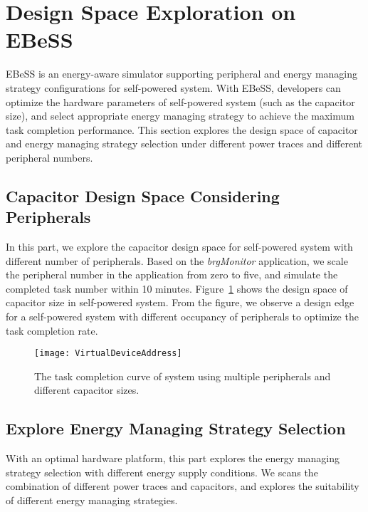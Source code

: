 \section{Design Space Exploration on EBeSS}	\label{sec:exp}
%
EBeSS is an energy-aware simulator supporting peripheral and energy managing strategy configurations for self-powered system.
With EBeSS, developers can optimize the hardware parameters of self-powered system (such as the capacitor size), and select appropriate energy managing strategy to achieve the maximum task completion performance. 
This section explores the design space of capacitor and energy managing strategy selection under different power traces and different peripheral numbers.

\subsection{Capacitor Design Space Considering Peripherals}
%
In this part, we explore the capacitor design space for self-powered system with different number of peripherals. 
Based on the \emph{brgMonitor} application, we scale the peripheral number in the application from zero to five, and simulate the completed task number within 10 minutes.
Figure~\ref{fig:CapVsBenchmark} shows the design space of capacitor size in self-powered system.
From the figure, we observe a design edge for a self-powered system with different occupancy of peripherals to optimize the task completion rate.

\begin{figure}[!htpb]
	\centering
	\vspace{-5pt}
	\texttt{[image: VirtualDeviceAddress]}
	\vspace{-5pt}
	\caption{The task completion curve of system using multiple peripherals and different capacitor sizes.}	\label{fig:CapVsBenchmark}
\end{figure}

\subsection{Explore Energy Managing Strategy Selection}
%
With an optimal hardware platform, this part explores the energy managing strategy selection with different energy supply conditions.
We scans the combination of different power traces and capacitors, and explores the suitability of different energy managing strategies.

